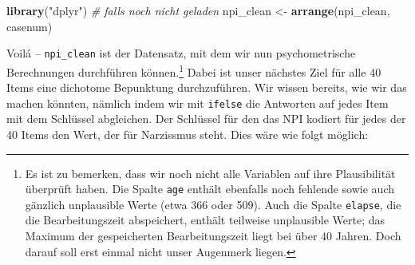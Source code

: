 \documentclass[12pt,]{tufte-book}
\newenvironment{Shaded}{\begin{snugshade}}{\end{snugshade}}
\newcommand{\KeywordTok}[1]{\textcolor[rgb]{0.13,0.29,0.53}{\textbf{#1}}}
\newcommand{\DecValTok}[1]{\textcolor[rgb]{0.00,0.00,0.81}{#1}}
\newcommand{\StringTok}[1]{\textcolor[rgb]{0.31,0.60,0.02}{#1}}
\newcommand{\CommentTok}[1]{\textcolor[rgb]{0.56,0.35,0.01}{\textit{#1}}}
\newcommand{\OperatorTok}[1]{\textcolor[rgb]{0.81,0.36,0.00}{\textbf{#1}}}
\newcommand{\NormalTok}[1]{#1}
\theoremstyle{definition}
\theoremstyle{definition}
\theoremstyle{definition}
\theoremstyle{remark}
\begin{document}
\begin{Shaded}
\begin{Highlighting}[]
\KeywordTok{library}\NormalTok{(}\StringTok{"dplyr"}\NormalTok{)  }\CommentTok{# falls noch nicht geladen}
\NormalTok{npi_clean <-}\StringTok{ }\KeywordTok{arrange}\NormalTok{(npi_clean, casenum)}
\end{Highlighting}
\end{Shaded}

Voilá -- \texttt{npi\_clean} ist der Datensatz, mit dem wir nun
psychometrische Berechnungen durchführen können.\footnote{Es ist zu
  bemerken, dass wir noch nicht alle Variablen auf ihre Plausibilität
  überprüft haben. Die Spalte \texttt{age} enthält ebenfalls noch
  fehlende sowie auch gänzlich unplausible Werte (etwa 366 oder 509).
  Auch die Spalte \texttt{elapse}, die die Bearbeitungszeit abspeichert,
  enthält teilweise unplausible Werte; das Maximum der gespeicherten
  Bearbeitungszeit liegt bei über 40 Jahren. Doch darauf soll erst
  einmal nicht unser Augenmerk liegen.} Dabei ist unser nächstes Ziel
für alle 40 Items eine dichotome Bepunktung durchzuführen. Wir wissen
bereits, wie wir das machen könnten, nämlich indem wir mit
\texttt{ifelse} die Antworten auf jedes Item mit dem Schlüssel
abgleichen. Der Schlüssel für den das NPI kodiert für jedes der 40 Items
den Wert, der für Narzissmus steht. Dies wäre wie folgt möglich:

\begin{Shaded}
\end{Shaded}
\end{document}

